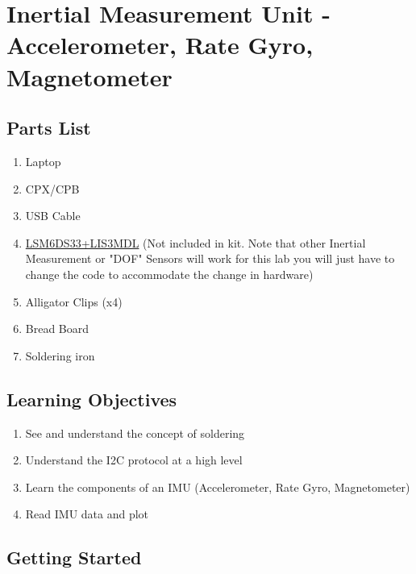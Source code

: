 \newpage

\section{Inertial Measurement Unit - Accelerometer, Rate Gyro, Magnetometer}

\subsection{Parts List}

\begin{enumerate}[itemsep=-5pt]
\item Laptop
\item CPX/CPB 
\item USB Cable
\item \href{https://www.adafruit.com/product/4485}{LSM6DS33+LIS3MDL} (Not included in kit. Note that other Inertial Measurement or "DOF" Sensors will work for this lab you will just have to change the code to accommodate the change in hardware)
\item Alligator Clips (x4)
\item Bread Board
\item Soldering iron
\end{enumerate}

\subsection{Learning Objectives}
\begin{enumerate}[itemsep=-5pt]
\item See and understand the concept of soldering
\item Understand the I2C protocol at a high level
\item Learn the components of an IMU (Accelerometer, Rate Gyro, Magnetometer)
\item Read IMU data and plot
\end{enumerate}

\subsection{Getting Started}

